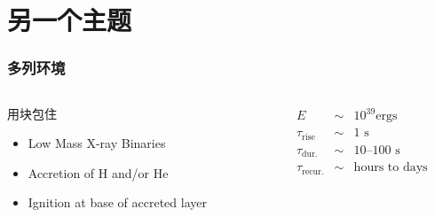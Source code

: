 \documentclass[hyperref={bookmarks=false},CJK]{beamer}
\begin{document}
\section{另一个主题}
\begin{frame}
  \frametitle{多列环境}
  \label{sec-1-2}
  \begin{columns}
    \begin{column}{0.5\textwidth}
      \begin{block}{用块包住}
        \label{sec-1-2-1}

        \begin{itemize}
          \item Low Mass X-ray Binaries
          \item Accretion of H and/or He
          \item Ignition at base of accreted layer
        \end{itemize}
      \end{block}
    \end{column}
    \begin{column}{0.5\textwidth}
      \label{sec-1-2-2}
      \color{yellow}
      \begin{eqnarray*}
        E &\sim& 10^{39} \text{ergs}\\
        \tau_\text{rise} &\sim& 1 \text{ s} \\
        \tau_\text{dur.} &\sim& 10\text{--}100\text{ s} \\
        \tau_\text{recur.} &\sim& \text{hours to days}
      \end{eqnarray*}
    \end{column}
  \end{columns}
\end{frame}
\end{document}
